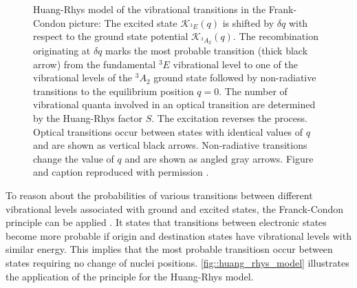    \begin{figure}[htbp]
     \centering
     \caption[Huang-Rhys model of vibrational transitions]{Huang-Rhys model of the vibrational transitions in the Frank-Condon picture: The excited state $\mathcal{K}_{{}^{3}E}(q)$ is shifted by $\delta q$ with respect to the ground state potential $\mathcal{K}_{{}^{3}A_{2}}(q)$. The recombination originating at $\delta q$ marks the most probable transition (thick black arrow) from the fundamental ${}^{3}E$ vibrational level to one of the vibrational levels of the ${}^{3}A_{2}$ ground state followed by non-radiative transitions to the equilibrium position $q = 0$. The number of vibrational quanta involved in an optical transition are determined by the Huang-Rhys factor $S$. The excitation reverses the process. Optical transitions occur between states with identical values of $q$ and are shown as vertical black arrows. Non-radiative transitions change the value of $q$ and are shown as angled gray arrows. Figure and caption reproduced with permission \cite{janine::thesis}.}
     \label{fig::huang_rhys_model}
   \end{figure}

   To reason about the probabilities of various transitions between different vibrational levels associated with ground and excited states, the Franck-Condon principle can be applied \cite{J.Franck: Elementary processes of photochemical reactions, E. U. Condon: A Theory of Intensity Distribution in Band Systems}. It states that transitions between electronic states become more probable if origin and destination states have vibrational levels with similar energy. This implies that the most probable transitiosn occur between states requiring no change of nuclei positions. \autoref{fig::huang_rhys_model} illustrates the application of the principle for the Huang-Rhys model.

